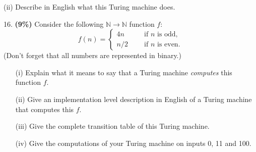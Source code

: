 \documentclass[11pt]{article}
\begin{document}
\noindent
%
(ii) Describe in English what this Turing machine does.
 \begin{itemize}
    \item[] {
  }
\end{itemize}






\bigskip
\noindent
%
16. {\bf (9\%)} Consider the following $\mathbb N \to \mathbb N$ function $f$:
%
\[
f(n)=\left\{
 \begin{array}{ll}
 4n\qquad &\mbox{if $n$ is odd},\\
 n/2 &\mbox{if $n$ is even}.
 \end{array}
\right.
\]
%
(Don't forget that all numbers are represented in binary.)
%
\begin{itemize}
\item[(i)] Explain what it means to say that a Turing machine \emph{computes} this function $f$.
 \begin{itemize}
    \item[] {
      \fbox{
        \parbox{\textwidth}{
        }
     }
  }
\end{itemize}

\item[(ii)] Give an implementation level description in English of a Turing machine that computes this $f$.
 \begin{itemize}
    \item[] {
      \fbox{
        \parbox{\textwidth}{
        }
     }
  }
\end{itemize}

\item[(iii)]
Give the complete transition table of this Turing machine.
 \begin{itemize}
    \item[] {
      \fbox{
        \parbox{\textwidth}{
        }
     }
  }
\end{itemize}

\item[(iv)] Give the computations of your Turing machine on inputs 0, 11 and 100.
 \begin{itemize}
    \item[] {
      \fbox{
        \parbox{\textwidth}{
        }
     }
  }
\end{itemize}

\end{itemize}
\end{document}
